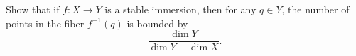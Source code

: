 Show that if $f: X \rightarrow Y$ is a stable immersion, then for any $q \in Y$, the number of points in the fiber $f^{-1}(q)$ is bounded by
$$\frac{\dim Y}{\dim Y - \dim X}.$$

